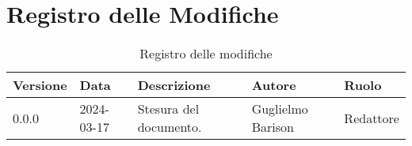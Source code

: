 \section*{Registro delle Modifiche}
\begin{table}[ht!]	
	\centering
	\begin{tabular}{p{1.2cm} p{2cm} p{6cm} p{3cm} p{2cm}}
		\toprule
		\textbf{Versione}& \textbf{Data} & \textbf{Descrizione} & \textbf{Autore} & \textbf{Ruolo} \\
		\midrule
		0.0.0 & 2024-03-17 & Stesura del documento.  & Guglielmo Barison & Redattore \\
		\bottomrule
	\end{tabular}
	\caption{Registro delle modifiche}
	\label{table:Registro delle modifiche}
\end{table}
\newpage

